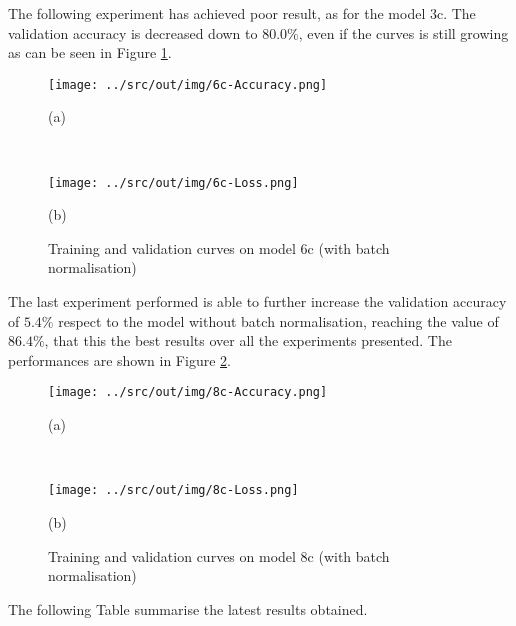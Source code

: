 \documentclass[a4paper,12pt]{article} %
\begin{document}
	The following experiment has achieved poor result, as for the model 3c. The 
	validation accuracy is decreased down to $80.0\%$, even if the curves is 
	still growing as can be seen in Figure \ref{fig:model6c-performance}. 
	\newline

	\begin{figure}[htb]
		\begin{minipage}[c]{.49\textwidth}
			\centering
			\texttt{[image: ../src/out/img/6c-Accuracy.png]}
			\caption*{(a)}
		\end{minipage}
		~
		\begin{minipage}[c]{.49\textwidth}
			\centering
			\texttt{[image: ../src/out/img/6c-Loss.png]}
			\caption*{(b)}
		\end{minipage}
		\caption{Training and validation curves on model 6c (with batch 
		normalisation)}
		\label{fig:model6c-performance}
	\end{figure}

	The last experiment performed is able to further increase the validation 
	accuracy of $5.4\%$ respect to the model without batch normalisation, 
	reaching the value of $86.4\%$, that this the best results over all the 
	experiments presented.
	The performances are shown in Figure \ref{fig:model8c-performance}.
	\newline

	\begin{figure}[htb]
		\begin{minipage}[c]{.49\textwidth}
			\centering
			\texttt{[image: ../src/out/img/8c-Accuracy.png]}
			\caption*{(a)}
		\end{minipage}
		~
		\begin{minipage}[c]{.49\textwidth}
			\centering
			\texttt{[image: ../src/out/img/8c-Loss.png]}
			\caption*{(b)}
		\end{minipage}
		\caption{Training and validation curves on model 8c (with batch 
		normalisation)}
		\label{fig:model8c-performance}
	\end{figure}
	
	The following Table summarise the latest results obtained.
	
\end{document}
